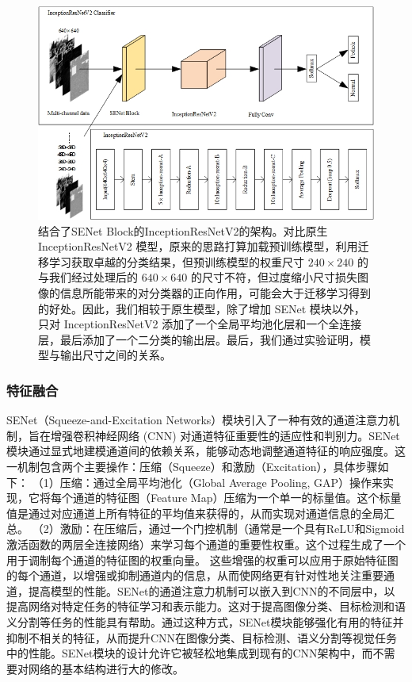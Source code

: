 \documentclass[a4paper, 10pt]{article}
\begin{document}
	\begin{figure}[htb]
		\centering 
		\includegraphics[width=0.8\columnwidth]{picture/InceptionResNetV2}
		\caption{
			\label{fig: InceptionResNetV2 Architecture} 
			结合了SENet Block的InceptionResNetV2的架构。对比原生 InceptionResNetV2 模型，原来的思路打算加载预训练模型，利用迁移学习获取卓越的分类结果，但预训练模型的权重尺寸 $240\times 240$ 的与我们经过处理后的 $640 \times 640$ 的尺寸不符，但过度缩小尺寸损失图像的信息所能带来的对分类器的正向作用，可能会大于迁移学习得到的好处。因此，我们相较于原生模型，除了增加 SENet 模块以外，只对 InceptionResNetV2 添加了一个全局平均池化层和一个全连接层，最后添加了一个二分类的输出层。最后，我们通过实验证明，模型与输出尺寸之间的关系。
		}
	\end{figure}
	
	\subsubsection{特征融合}
	
	SENet（Squeeze-and-Excitation Networks）模块引入了一种有效的通道注意力机制，旨在增强卷积神经网络 (CNN) 对通道特征重要性的适应性和判别力。SENet模块通过显式地建模通道间的依赖关系，能够动态地调整通道特征的响应强度。这一机制包含两个主要操作：压缩（Squeeze）和激励（Excitation），具体步骤如下：
	（1）压缩：通过全局平均池化（Global Average Pooling, GAP）操作来实现，它将每个通道的特征图（Feature Map）压缩为一个单一的标量值。这个标量值是通过对应通道上所有特征的平均值来获得的，从而实现对通道信息的全局汇总。
	（2）激励：在压缩后，通过一个门控机制（通常是一个具有ReLU和Sigmoid激活函数的两层全连接网络）来学习每个通道的重要性权重。这个过程生成了一个用于调制每个通道的特征图的权重向量。
	这些增强的权重可以应用于原始特征图的每个通道，以增强或抑制通道内的信息，从而使网络更有针对性地关注重要通道，提高模型的性能。SENet的通道注意力机制可以嵌入到CNN的不同层中，以提高网络对特定任务的特征学习和表示能力。这对于提高图像分类、目标检测和语义分割等任务的性能具有帮助。通过这种方式，SENet模块能够强化有用的特征并抑制不相关的特征，从而提升CNN在图像分类、目标检测、语义分割等视觉任务中的性能。SENet模块的设计允许它被轻松地集成到现有的CNN架构中，而不需要对网络的基本结构进行大的修改。
	
\end{document}

